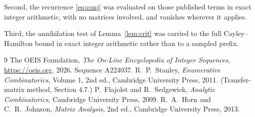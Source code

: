 \documentclass[11pt,a4paper]{article}
\theoremstyle{plain}
\theoremstyle{definition}
\begin{document}
Second, the recurrence \eqref{eq:conj} was evaluated on those published terms in exact
integer arithmetic, with no matrices involved, and vanishes wherever it applies.

Third, the annihilation test of Lemma~\ref{lem:crit} was carried to the full
Cayley--Hamilton bound in exact integer arithmetic rather than to a sampled prefix.

\begin{thebibliography}{9}
 The OEIS Foundation, \emph{The On-Line Encyclopedia of Integer
Sequences}, \url{https://oeis.org}, 2026. Sequence A224037.
 R.~P.~Stanley, \emph{Enumerative Combinatorics}, Volume 1, 2nd ed.,
Cambridge University Press, 2011. (Transfer-matrix method, Section 4.7.)
 P.~Flajolet and R.~Sedgewick, \emph{Analytic Combinatorics}, Cambridge
University Press, 2009.
 R.~A.~Horn and C.~R.~Johnson, \emph{Matrix Analysis}, 2nd ed., Cambridge
University Press, 2013.
\end{thebibliography}
\end{document}
